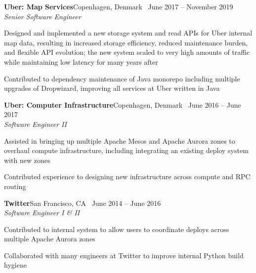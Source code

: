 \documentclass[12pt]{article}
\newcommand{\leftandright}[2]{\noindent\textbf{#1}\hfill{#2}}
\begin{document}
\leftandright{Uber: Map Services}{Copenhagen, Denmark \textbullet\, June 2017 -- November 2019} \\
\textit{Senior Software Engineer}\\[0.1em] %
\vspace{-1.4em}
\begin{itemize*} %
\item
Designed and implemented a new storage system and read APIs for Uber internal map data, resulting in increased storage efficiency, reduced maintenance burden, and flexible API evolution; the new system scaled to very high amounts of traffic while maintaining low latency for many years after
\item
Contributed to dependency maintenance of Java monorepo including multiple upgrades of Dropwizard, improving all services at Uber written in Java
\end{itemize*}

\leftandright{Uber: Computer Infrastructure}{Copenhagen, Denmark \textbullet\, June 2016 -- June 2017} \\
\textit{Software Engineer II}\\[0.1em] %
\vspace{-1.4em}
\begin{itemize*} %
\item
Assisted in bringing up multiple Apache Mesos and Apache Aurora zones to overhaul compute infrastructure, including integrating an existing deploy system with new zones
\item
Contributed experience to designing new infrastructure across compute and RPC routing
\end{itemize*}

\leftandright{Twitter}{San Francisco, CA \textbullet\, June 2014 -- June 2016} \\
\textit{Software Engineer I \& II}\\[0.1em] %
\vspace{-1.4em}
\begin{itemize*} %
\item
Contributed to internal system to allow users to coordinate deploys across multiple Apache Aurora zones
\item
Collaborated with many engineers at Twitter to improve internal Python build hygiene
\end{itemize*}
\end{document}
